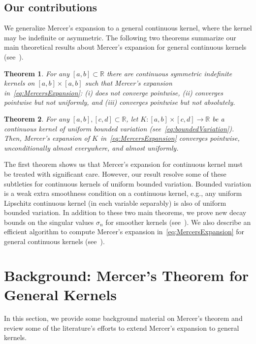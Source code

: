 \documentclass{article}
\newtheorem*{theorem*}{Theorem}
\begin{document}
\subsection{Our contributions}
We generalize Mercer's expansion to a general continuous kernel, where the kernel may be indefinite or asymmetric. The following two theorems summarize our main theoretical results about Mercer's expansion for general continuous kernels (see~).

\begin{theorem*}
For any $[a, b]\subset \mathbb{R}$ there are continuous symmetric indefinite kernels on $[a,b]\times [a,b]$ such that Mercer's expansion in~\cref{eq:MercersExpansion}: (i) does not converge pointwise, (ii) converges pointwise but not uniformly, and (iii) converges pointwise but not absolutely. 
\end{theorem*}

\begin{theorem*}
For any $[a, b], [c, d]\subset \mathbb{R}$, let $K:[a,b]\times [c,d]\to \mathbb{R}$ be a continuous kernel of uniform bounded variation (see~\cref{eq:boundedVariation}). Then, Mercer's expansion of $K$ in~\cref{eq:MercersExpansion} converges pointwise, unconditionally almost everywhere, and almost uniformly. 
\end{theorem*}

The first theorem shows us that Mercer's expansion for continuous kernel must be treated with significant care. However, our result resolve some of these subtleties for continuous kernels of uniform bounded variation. Bounded variation is a weak extra smoothness condition on a continuous kernel, e.g., any uniform Lipschitz continuous kernel (in each variable separably) is also of uniform bounded variation. In addition to these two main theorems, we prove new decay bounds on the singular values $\sigma_n$ for smoother kernels (see~). We also describe an efficient algorithm to compute Mercer's expansion in~\cref{eq:MercersExpansion} for general continuous kernels (see~). 

\section{Background: Mercer's Theorem for General Kernels}

In this section, we provide some background material on Mercer's theorem and review some of the literature's efforts to extend Mercer's expansion to general kernels. 
\end{document}
